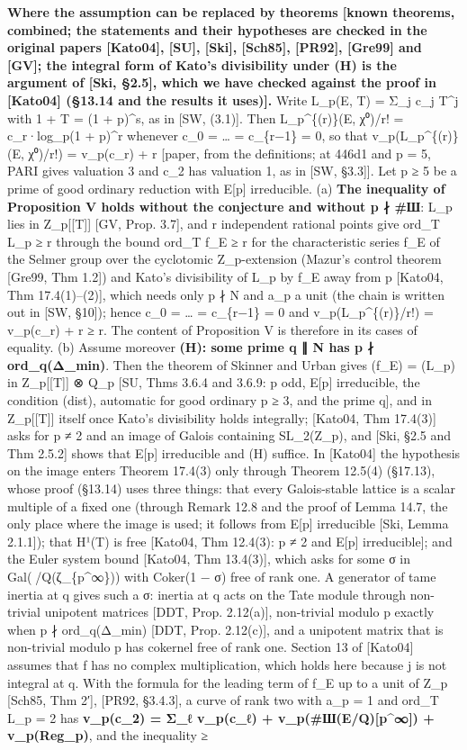 \documentclass[11pt,a4paper]{article}
\theoremstyle{named}
\begin{document}
\textbf{Where the assumption can be replaced by theorems [known theorems, combined; the statements and their hypotheses are checked in the original papers [Kato04], [SU], [Ski], [Sch85], [PR92], [Gre99] and [GV]; the integral form of Kato's divisibility under (H) is the argument of [Ski, §2.5], which we have checked against the proof in [Kato04] (§13.14 and the results it uses)].} Write L\_p(E, T) = Σ\_j c\_j T\textasciicircum{}j with 1 + T = (1 + p)\textasciicircum{}s, as in [SW, (3.1)]. Then L\_p\textasciicircum{}\{(r)\}(E, χ⁰)/r! = c\_r·log\_p(1 + p)\textasciicircum{}r whenever c\_0 = … = c\_\{r−1\} = 0, so that v\_p(L\_p\textasciicircum{}\{(r)\}(E, χ⁰)/r!) = v\_p(c\_r) + r [paper, from the definitions; at 446d1 and p = 5, PARI gives valuation 3 and c\_2 has valuation 1, as in [SW, §3.3]]. Let p ≥ 5 be a prime of good ordinary reduction with E[p] irreducible. (a) \textbf{The inequality of Proposition V holds without the conjecture and without p ∤ \#Ш}: L\_p lies in Z\_p[[T]] [GV, Prop. 3.7], and r independent rational points give ord\_T L\_p ≥ r through the bound ord\_T f\_E ≥ r for the characteristic series f\_E of the Selmer group over the cyclotomic Z\_p-extension (Mazur's control theorem [Gre99, Thm 1.2]) and Kato's divisibility of L\_p by f\_E away from p [Kato04, Thm 17.4(1)–(2)], which needs only p ∤ N and a\_p a unit (the chain is written out in [SW, §10]); hence c\_0 = … = c\_\{r−1\} = 0 and v\_p(L\_p\textasciicircum{}\{(r)\}/r!) = v\_p(c\_r) + r ≥ r. The content of Proposition V is therefore in its cases of equality. (b) Assume moreover \textbf{(H): some prime q ∥ N has p ∤ ord\_q(Δ\_min)}. Then the theorem of Skinner and Urban gives (f\_E) = (L\_p) in Z\_p[[T]] ⊗ Q\_p [SU, Thms 3.6.4 and 3.6.9: p odd, E[p] irreducible, the condition (dist), automatic for good ordinary p ≥ 3, and the prime q], and in Z\_p[[T]] itself once Kato's divisibility holds integrally; [Kato04, Thm 17.4(3)] asks for p ≠ 2 and an image of Galois containing SL\_2(Z\_p), and [Ski, §2.5 and Thm 2.5.2] shows that E[p] irreducible and (H) suffice. In [Kato04] the hypothesis on the image enters Theorem 17.4(3) only through Theorem 12.5(4) (§17.13), whose proof (§13.14) uses three things: that every Galois-stable lattice is a scalar multiple of a fixed one (through Remark 12.8 and the proof of Lemma 14.7, the only place where the image is used; it follows from E[p] irreducible [Ski, Lemma 2.1.1]); that H¹(T) is free [Kato04, Thm 12.4(3): p ≠ 2 and E[p] irreducible]; and the Euler system bound [Kato04, Thm 13.4(3)], which asks for some σ in Gal(/Q(ζ\_\{p\textasciicircum{}∞\})) with Coker(1 − σ) free of rank one. A generator of tame inertia at q gives such a σ: inertia at q acts on the Tate module through non-trivial unipotent matrices [DDT, Prop. 2.12(a)], non-trivial modulo p exactly when p ∤ ord\_q(Δ\_min) [DDT, Prop. 2.12(c)], and a unipotent matrix that is non-trivial modulo p has cokernel free of rank one. Section 13 of [Kato04] assumes that f has no complex multiplication, which holds here because j is not integral at q. With the formula for the leading term of f\_E up to a unit of Z\_p [Sch85, Thm 2′], [PR92, §3.4.3], a curve of rank two with a\_p = 1 and ord\_T L\_p = 2 has \textbf{v\_p(c\_2) = Σ\_ℓ v\_p(c\_ℓ) + v\_p(\#Ш(E/Q)[p\textasciicircum{}∞]) + v\_p(Reg\_p)}, and the inequality ≥ 
\end{document}
